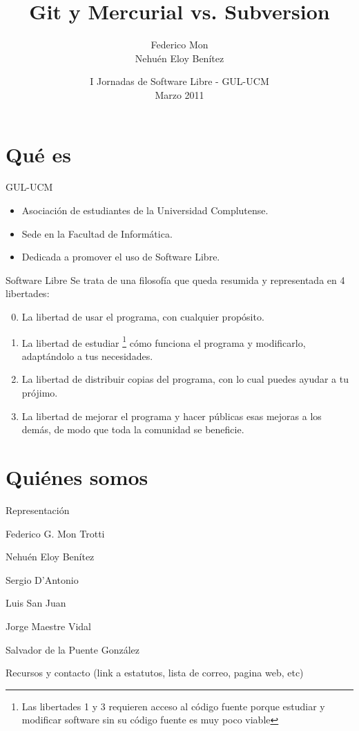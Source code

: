 \documentclass[spanish]{beamer}
\title[Git y Mercurial vs. SVN - GUL-UCM]
{Git y Mercurial vs. Subversion
}
\author[\url{http://gulucm.org}]
{
Federico Mon \\
Nehuén Eloy Benítez
}
\institute{Facultad de Informática.\\Universidad Complutense de Madrid.}
\date{
I Jornadas de Software Libre - GUL-UCM\\
Marzo 2011}
\begin{document}
    \frame{\titlepage}
    \section{Qué es}
        \begin{frame}{GUL-UCM}
            \begin{itemize}
                \item Asociación de estudiantes de la Universidad Complutense.
                \item Sede en la Facultad de Informática.
                \item Dedicada a promover el uso de Software Libre.
            \end{itemize}
        \end{frame}
        \begin{frame}{Software Libre}
            Se trata de una filosofía que queda resumida y representada en 4 
            libertades:
            \begin{enumerate}
            \setcounter{enumi}{-1}
                \item La libertad de usar el programa, con cualquier propósito.
                \item La libertad de estudiar \footnote{Las libertades 1 y 3 
                requieren acceso al código fuente porque estudiar y modificar 
                software sin su código fuente es muy poco viable} cómo funciona 
                el programa y modificarlo, adaptándolo a tus necesidades.
                \item La libertad de distribuir copias del programa, con lo cual
                 puedes ayudar a tu prójimo.
                \item La libertad de mejorar el programa y hacer públicas esas 
                mejoras a los demás, de modo que toda la comunidad se beneficie.
            \end{enumerate}
        \end{frame}

    \section{Quiénes somos}
        \begin{frame}{Representación}
            \begin{description}[Left]
                \item [Presidente:] Federico G. Mon Trotti
                \item [Vicepresidente:] Nehuén Eloy Benítez
                \item [Secretario:] Sergio D'Antonio
                \item [Tesorero:] Luis San Juan
                \item [Vocal de representación estudiantil:] Jorge Maestre Vidal
                \item [Vocal de actividades:] Salvador de la Puente González
            \end{description}
        \end{frame}
        \begin{frame}{Recursos y contacto}
            (link a estatutos, lista de correo, pagina web, etc)
        \end{frame}
\end{document}
